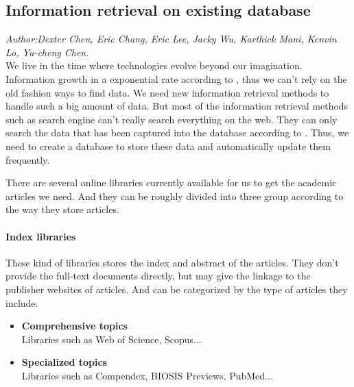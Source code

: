 	
\subsection{Information retrieval on existing database}
\textit{\footnotesize Author:Dexter Chen, Eric Chang, Eric Lee, Jacky Wu, Karthick Mani, Kenvin Lo, Yu-cheng Chen.}\\

We live in the time where technologies evolve beyond our imagination. Information growth in a exponential rate according to \cite{Tague1981}, thus we can't rely on the old fashion ways to find data. We need new information retrieval methods to handle such a big amount of data. But most of the information retrieval methods such as search engine can't really search everything on the web. They can only search the data that has been captured into the database according to \cite{Grehan2002}. Thus, we need to create a database to store these data and automatically update them frequently.

There are several online libraries currently available for us to get the academic articles we need. And they can be roughly divided into three group according to the way they store articles.

\paragraph{Index libraries}
	These kind of libraries stores the index and abstract of the articles. They don't provide the full-text documents directly, but may give the linkage to the publisher websites of articles. And can be categorized by the type of articles they include.
	\begin{itemize}
		\item\textbf{Comprehensive topics}\\Libraries such as Web of Science, Scopus...
		\item\textbf{Specialized topics}\\Libraries such as Compendex, BIOSIS Previews, PubMed...
	\end{itemize}
	
